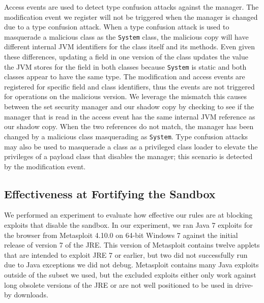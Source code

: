 \documentclass{sig-alternate}
\begin{document}
Access events are used to detect type confusion attacks against the
manager. The modification event we register will not be triggered
when the manager is changed due to a type confusion attack. When a
type confusion attack is used to masquerade a malicious class as the
\texttt{System} class, the malicious copy will have different internal
JVM identifiers for the class itself and its methods. Even given these
differences, updating a field in one version of the class updates
the value the JVM stores for the field in both classes because \texttt{System} is static and both classes appear to have the same type. The
modification and access events are registered for specific field and
class identifiers, thus the events are not triggered for operations
on the malicious version. We leverage the mismatch this causes between
the set security manager and our shadow copy by checking to see if
the manager that is read in the access event has the same internal
JVM reference as our shadow copy. When the two references do not match,
the manager has been changed by a malicious class masquerading as
\texttt{System}. Type confusion attacks may also be used to masquerade
a class as a privileged class loader to elevate the privileges of
a payload class that disables the manager; this scenario is detected
by the modification event.


\subsection{Effectiveness at Fortifying the Sandbox}\label{sub:Effectiveness-at-Fortifying}


We performed an experiment to evaluate how effective our rules are
at blocking exploits that disable the sandbox. In our experiment,
we ran Java 7 exploits for the browser from Metasploit 4.10.0 on 64-bit
Windows 7 against the initial release of version 7 of the JRE. This
version of Metasploit contains twelve applets that are intended to
exploit JRE 7 or earlier, but two did not successfully run due to
Java exceptions we did not debug. Metasploit contains many Java exploits
outside of the subset we used, but the excluded exploits either only
work against long obsolete versions of the JRE or are not well positioned
to be used in drive-by downloads. 
\end{document}
